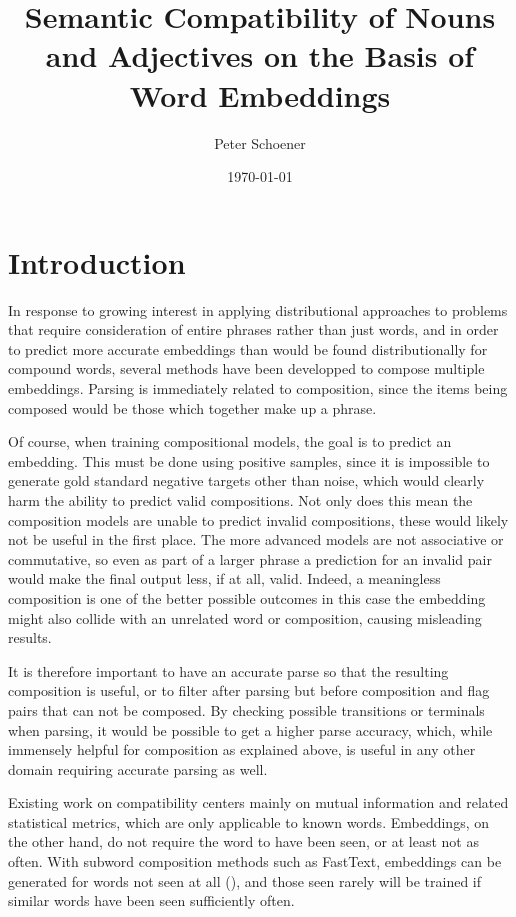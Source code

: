 \documentclass[a4paper, 11pt]{scrartcl}
\begin{document}
\title{Semantic Compatibility of Nouns and Adjectives on the Basis of Word Embeddings}
\author{Peter Schoener}
\date{\today}
\maketitle
\clearpage

\tableofcontents
\clearpage

\section{Introduction}

In response to growing interest in applying distributional approaches to problems that require consideration of entire phrases rather than just words, and in order to predict more accurate embeddings than would be found distributionally for compound words, several methods have been developped to compose multiple embeddings. Parsing is immediately related to composition, since the items being composed would be those which together make up a phrase.

Of course, when training compositional models, the goal is to predict an embedding. This must be done using positive samples, since it is impossible to generate gold standard negative targets other than noise, which would clearly harm the ability to predict valid compositions. Not only does this mean the composition models are unable to predict invalid compositions, these would likely not be useful in the first place. The more advanced models are not associative or commutative, so even as part of a larger phrase a prediction for an invalid pair would make the final output less, if at all, valid. Indeed, a meaningless composition is one of the better possible outcomes in this case \textemdash the embedding might also collide with an unrelated word or composition, causing misleading results.

It is therefore important to have an accurate parse so that the resulting composition is useful, or to filter after parsing but before composition and flag pairs that can not be composed. By checking possible transitions or terminals when parsing, it would be possible to get a higher parse accuracy, which, while immensely helpful for composition as explained above, is useful in any other domain requiring accurate parsing as well.

Existing work on compatibility centers mainly on mutual information and related statistical metrics, which are only applicable to known words. Embeddings, on the other hand, do not require the word to have been seen, or at least not as often. With subword composition methods such as FastText, embeddings can be generated for words not seen at all (\cite{FastText}), and those seen rarely will be trained if similar words have been seen sufficiently often.
\end{document}
